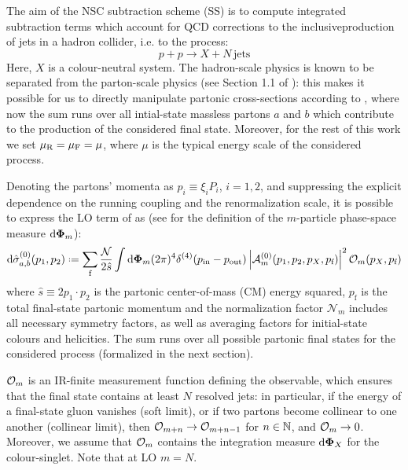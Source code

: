 
The aim of the NSC subtraction scheme (SS) is to compute integrated subtraction terms which account for QCD corrections to the inclusive\footnotemark production of jets in a hadron collider, i.e. to the process:
\begin{equation}
  p + p \rightarrow X + N \,\text{jets}
\end{equation}
Here, $ X $ is a colour-neutral system. The hadron-scale physics is known to be separated from the parton-scale physics (see Section 1.1 of \cite{Collins-2011}): this makes it possible for us to directly manipulate partonic cross-sections according to , where now the sum runs over all intial-state massless partons $ a $ and $ b $ which contribute to the production of the considered final state. Moreover, for the rest of this work we set $ \mu_\text{R} = \mu_\text{F} = \mu $, where $ \mu $ is the typical energy scale of the considered process.


Denoting the partons' momenta as $ p_i \equiv \xi_i P_i $, $ i = 1,2 $, and suppressing the explicit dependence on the running coupling and the renormalization scale, it is possible to express the LO term of  as (see  for the definition of the $ m $-particle phase-space measure $ \mathrm{d} \boldsymbol{\Phi}_m $):
\begin{equation}
  \dd\pcs_{a,b}^{(0)}(p_1 , p_2) \defeq \sum_\text{f} \frac{\mathcal{N}}{2\hat{s}} \int \lps_m (2\pi)^4 \delta^{(4)}(p_\text{in} - p_\text{out}) \abs{\ampl^{(0)}_m(p_1, p_2, p_X, p_\text{f})}^2 \op_m(p_X, p_\text{f})
  \label{eq:ds-lo}
\end{equation}
where $ \hat{s} \equiv 2 p_1 \cdot p_2 $ is the partonic center-of-mass (CM) energy squared, $ p_\text{f} $ is the total final-state partonic momentum and the normalization factor $ \mathcal{N}_m $ includes all necessary symmetry factors, as well as averaging factors for initial-state colours and helicities. The sum runs over all possible partonic final states for the considered process (formalized in the next section).

$ \mathcal{O}_m $ is an IR-finite measurement function defining the observable, which ensures that the final state contains at least $ N $ resolved jets: in particular, if the energy of a final-state gluon vanishes (soft limit), or if two partons become collinear to one another (collinear limit), then $ \mathcal{O}_{m + n} \rightarrow \mathcal{O}_{m + n - 1} $ for $ n \in \mathbb{N} $, and $ \mathcal{O}_m \rightarrow 0 $. Moreover, we assume that $ \mathcal{O}_m $ contains the integration measure $ \mathrm{d} \boldsymbol{\Phi}_X $ for the colour-singlet. Note that at LO $ m = N $.

